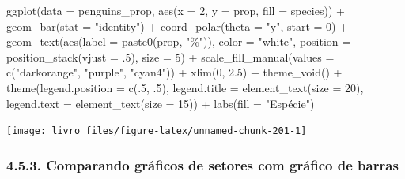 \documentclass[
]{book}
\newenvironment{Shaded}{\begin{snugshade}}{\end{snugshade}}
\newcommand{\AttributeTok}[1]{\textcolor[rgb]{0.61,0.61,0.61}{#1}}
\newcommand{\DecValTok}[1]{\textcolor[rgb]{0.06,0.06,0.06}{#1}}
\newcommand{\FloatTok}[1]{\textcolor[rgb]{0.06,0.06,0.06}{#1}}
\newcommand{\FunctionTok}[1]{\textcolor[rgb]{0,0,0}{#1}}
\newcommand{\NormalTok}[1]{#1}
\newcommand{\SpecialCharTok}[1]{\textcolor[rgb]{0,0,0}{#1}}
\newcommand{\StringTok}[1]{\textcolor[rgb]{0.5,0.5,0.5}{#1}}
\begin{document}
\begin{Shaded}
\begin{Highlighting}[]

\FunctionTok{ggplot}\NormalTok{(}\AttributeTok{data =}\NormalTok{ penguins\_prop, }\FunctionTok{aes}\NormalTok{(}\AttributeTok{x =} \DecValTok{2}\NormalTok{, }\AttributeTok{y =}\NormalTok{ prop, }\AttributeTok{fill =}\NormalTok{ species)) }\SpecialCharTok{+}
  \FunctionTok{geom\_bar}\NormalTok{(}\AttributeTok{stat =} \StringTok{"identity"}\NormalTok{) }\SpecialCharTok{+}
  \FunctionTok{coord\_polar}\NormalTok{(}\AttributeTok{theta =} \StringTok{"y"}\NormalTok{, }\AttributeTok{start =} \DecValTok{0}\NormalTok{) }\SpecialCharTok{+}
  \FunctionTok{geom\_text}\NormalTok{(}\FunctionTok{aes}\NormalTok{(}\AttributeTok{label =} \FunctionTok{paste0}\NormalTok{(prop, }\StringTok{"\%"}\NormalTok{)), }\AttributeTok{color =} \StringTok{"white"}\NormalTok{,}
            \AttributeTok{position =} \FunctionTok{position\_stack}\NormalTok{(}\AttributeTok{vjust =}\NormalTok{ .}\DecValTok{5}\NormalTok{), }\AttributeTok{size =} \DecValTok{5}\NormalTok{) }\SpecialCharTok{+}
  \FunctionTok{scale\_fill\_manual}\NormalTok{(}\AttributeTok{values =} \FunctionTok{c}\NormalTok{(}\StringTok{"darkorange"}\NormalTok{, }\StringTok{"purple"}\NormalTok{, }\StringTok{"cyan4"}\NormalTok{)) }\SpecialCharTok{+}
  \FunctionTok{xlim}\NormalTok{(}\DecValTok{0}\NormalTok{, }\FloatTok{2.5}\NormalTok{) }\SpecialCharTok{+}
  \FunctionTok{theme\_void}\NormalTok{() }\SpecialCharTok{+}
  \FunctionTok{theme}\NormalTok{(}\AttributeTok{legend.position =} \FunctionTok{c}\NormalTok{(.}\DecValTok{5}\NormalTok{, .}\DecValTok{5}\NormalTok{),}
        \AttributeTok{legend.title =} \FunctionTok{element\_text}\NormalTok{(}\AttributeTok{size =} \DecValTok{20}\NormalTok{),}
        \AttributeTok{legend.text =} \FunctionTok{element\_text}\NormalTok{(}\AttributeTok{size =} \DecValTok{15}\NormalTok{)) }\SpecialCharTok{+}
  \FunctionTok{labs}\NormalTok{(}\AttributeTok{fill =} \StringTok{"Espécie"}\NormalTok{)}
\end{Highlighting}
\end{Shaded}

\begin{center}\texttt{[image: livro\_files/figure-latex/unnamed-chunk-201-1]} \end{center}

\hypertarget{comparando-gruxe1ficos-de-setores-com-gruxe1fico-de-barras}{%
\subsubsection{4.5.3. Comparando gráficos de setores com gráfico de barras}\label{comparando-gruxe1ficos-de-setores-com-gruxe1fico-de-barras}}
\end{document}

